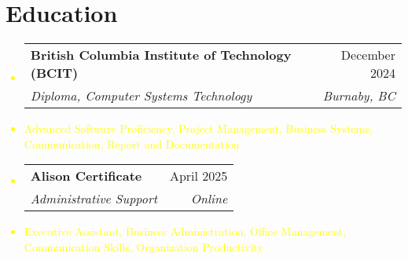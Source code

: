 \documentclass[letterpaper,11pt]{article}
\makeatletter
\newcommand{\resumeItem}[1]{
\item\small{
{#1 \vspace{-2pt}}
}
}
\newcommand{\resumeSubheading}[4]{
\vspace{-2pt}\item
\begin{tabular*}{0.97\textwidth}[t]{l@{\extracolsep{\fill}}r}
\textbf{#1} & #2 \\
\textit{\small#3} & \textit{\small #4} \\
\end{tabular*}\vspace{-7pt}
}
\newcommand{\resumeSubItem}[1]{\resumeItem{#1}\vspace{-4pt}}
\newcommand{\resumeSubHeadingListStart}{\begin{itemize}[leftmargin=0.15in, label={}]}
\newcommand{\resumeSubHeadingListEnd}{\end{itemize}}
\makeatother
\begin{document}
\section{Education}
\textcolor{yellow}{\resumeSubHeadingListStart
\resumeSubheading{British Columbia Institute of Technology (BCIT)}{December 2024}{Diploma, Computer Systems Technology}{Burnaby, BC}
\resumeSubItem{Advanced Software Proficiency, Project Management, Business Systems, Communication, Report and Documentation}
\resumeSubheading{Alison Certificate}{April 2025}{Administrative Support}{Online}
\resumeSubItem{Executive Assistant, Business Administration, Office Management, Communication Skills, Organization Productivity}
\resumeSubHeadingListEnd}
\end{document}
